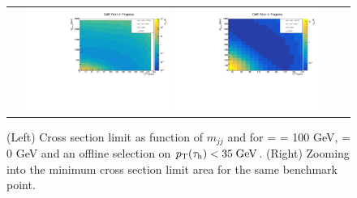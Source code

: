 \begin{figure}[tbh!]
	\centering
	\begin{tabular}{cc}
		\includegraphics[width=0.45\textwidth]{analysis/pics/JetInvMass_vs_MET_xsec_chi100_lsp000_taupt35.pdf}
		\includegraphics[width=0.45\textwidth]{analysis/pics/JetInvMass_vs_MET_xsec_chi100_lsp000_taupt35_zoom.pdf} 		
	\end{tabular}
	\caption{(Left) Cross section limit as function of $m_{jj}$ and \met for \charginopm = \neutralinotwo = 100 GeV, \neutralinoone = 0 GeV and an offline selection on $p_{\text{T}}(\tau_{\text{h}}) <  35\;\text{Ge}\kern-0.06667em\text{V}$. (Right) Zooming into the minimum cross section limit area for the same benchmark point.}
	\label{fig::JetInvMass_vs_MET_xsec_chi100_lsp000_taupt35}
\end{figure}


